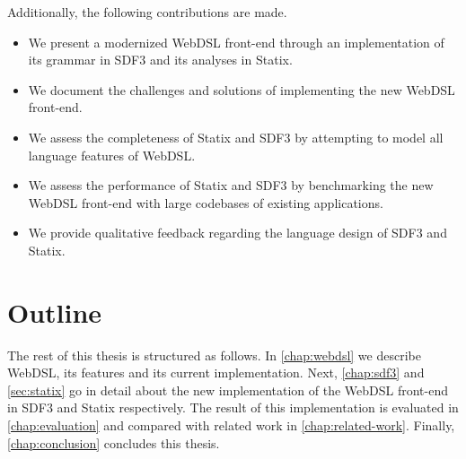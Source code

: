     Additionally, the following contributions are made.

    \begin{itemize}
      \item We present a modernized WebDSL front-end through an implementation of its grammar in SDF3 and its analyses in Statix.
      \item We document the challenges and solutions of implementing the new WebDSL front-end.
      \item We assess the completeness of Statix and SDF3 by attempting to model all language features of WebDSL.
      \item We assess the performance of Statix and SDF3 by benchmarking the new WebDSL front-end with large codebases of existing applications.
      \item We provide qualitative feedback regarding the language design of SDF3 and Statix.
    \end{itemize}

  \section{\label{sec:outline}Outline}
    The rest of this thesis is structured as follows. In \cref{chap:webdsl} we describe WebDSL, its features and its current implementation. Next, \cref{chap:sdf3} and \cref{sec:statix} go in detail about the new implementation of the WebDSL front-end in SDF3 and Statix respectively. The result of this implementation is evaluated in \cref{chap:evaluation} and compared with related work in \cref{chap:related-work}. Finally, \cref{chap:conclusion} concludes this thesis.

